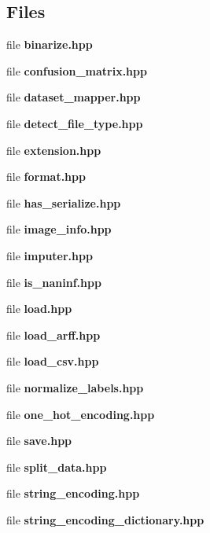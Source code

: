 \subsection*{Files}
\begin{DoxyCompactItemize}
\item 
file \textbf{ binarize.\+hpp}
\item 
file \textbf{ confusion\+\_\+matrix.\+hpp}
\item 
file \textbf{ dataset\+\_\+mapper.\+hpp}
\item 
file \textbf{ detect\+\_\+file\+\_\+type.\+hpp}
\item 
file \textbf{ extension.\+hpp}
\item 
file \textbf{ format.\+hpp}
\item 
file \textbf{ has\+\_\+serialize.\+hpp}
\item 
file \textbf{ image\+\_\+info.\+hpp}
\item 
file \textbf{ imputer.\+hpp}
\item 
file \textbf{ is\+\_\+naninf.\+hpp}
\item 
file \textbf{ load.\+hpp}
\item 
file \textbf{ load\+\_\+arff.\+hpp}
\item 
file \textbf{ load\+\_\+csv.\+hpp}
\item 
file \textbf{ normalize\+\_\+labels.\+hpp}
\item 
file \textbf{ one\+\_\+hot\+\_\+encoding.\+hpp}
\item 
file \textbf{ save.\+hpp}
\item 
file \textbf{ split\+\_\+data.\+hpp}
\item 
file \textbf{ string\+\_\+encoding.\+hpp}
\item 
file \textbf{ string\+\_\+encoding\+\_\+dictionary.\+hpp}
\end{DoxyCompactItemize}
